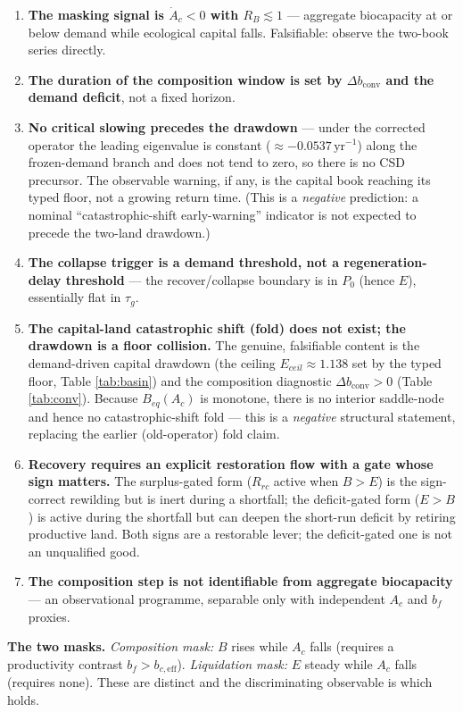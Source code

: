 \documentclass[11pt]{article}
\begin{document}
\begin{enumerate}
\item \textbf{The masking signal is $\dot A_c<0$ with $R_B\lesssim1$} --- aggregate biocapacity at or below demand while ecological capital falls. Falsifiable: observe the two-book series directly.
\item \textbf{The duration of the composition window is set by $\Delta b_{\mathrm{conv}}$ and the demand deficit}, not a fixed horizon.
\item \textbf{No critical slowing precedes the drawdown} --- under the corrected operator the leading eigenvalue is constant ($\approx-0.0537\,\text{yr}^{-1}$) along the frozen-demand branch and does not tend to zero, so there is no CSD precursor. The observable warning, if any, is the capital book reaching its typed floor, not a growing return time. (This is a \emph{negative} prediction: a nominal ``catastrophic-shift early-warning'' indicator is not expected to precede the two-land drawdown.)
\item \textbf{The collapse trigger is a demand threshold, not a regeneration-delay threshold} --- the recover/collapse boundary is in $P_0$ (hence $E$), essentially flat in $\tau_g$.
\item \textbf{The capital-land catastrophic shift (fold) does not exist; the drawdown is a floor collision.} The genuine, falsifiable content is the demand-driven capital drawdown (the ceiling $E_{ceil}\approx1.138$ set by the typed floor, Table \ref{tab:basin}) and the composition diagnostic $\Delta b_{\mathrm{conv}}>0$ (Table \ref{tab:conv}). Because $B_{eq}(A_c)$ is monotone, there is no interior saddle-node and hence no catastrophic-shift fold --- this is a \emph{negative} structural statement, replacing the earlier (old-operator) fold claim.
\item \textbf{Recovery requires an explicit restoration flow with a gate whose sign matters.} The surplus-gated form ($R_{rc}$ active when $B>E$) is the sign-correct rewilding but is inert during a shortfall; the deficit-gated form ($E>B$) is active during the shortfall but can deepen the short-run deficit by retiring productive land. Both signs are a restorable lever; the deficit-gated one is not an unqualified good.
\item \textbf{The composition step is not identifiable from aggregate biocapacity} --- an observational programme, separable only with independent $A_c$ and $b_f$ proxies.
\end{enumerate}

\noindent\textbf{The two masks.} \emph{Composition mask:} $B$ rises while $A_c$ falls (requires a productivity contrast $b_f>b_{c,\mathrm{eff}}$). \emph{Liquidation mask:} $E$ steady while $A_c$ falls (requires none). These are distinct and the discriminating observable is which holds.
\end{document}
